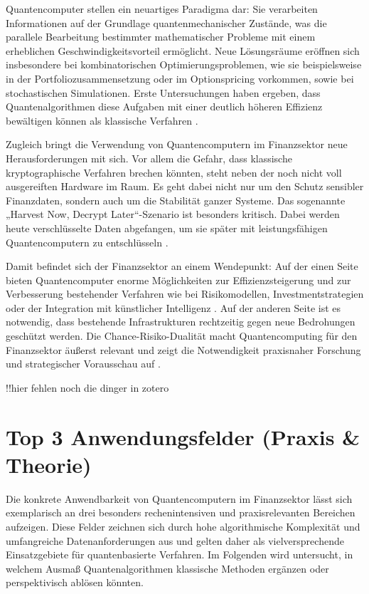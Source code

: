 Quantencomputer stellen ein neuartiges Paradigma dar: Sie verarbeiten Informationen auf der Grundlage quantenmechanischer Zustände, was die parallele Bearbeitung bestimmter mathematischer Probleme mit einem erheblichen Geschwindigkeitsvorteil ermöglicht. Neue Lösungsräume eröffnen sich insbesondere bei kombinatorischen Optimierungsproblemen, wie sie beispielsweise in der Portfoliozusammensetzung oder im Optionspricing vorkommen, sowie bei stochastischen Simulationen. Erste Untersuchungen haben ergeben, dass Quantenalgorithmen diese Aufgaben mit einer deutlich höheren Effizienz bewältigen können als klassische Verfahren \cite{quantumjournal2020,orus2019}.

Zugleich bringt die Verwendung von Quantencomputern im Finanzsektor neue Herausforderungen mit sich. Vor allem die Gefahr, dass klassische kryptographische Verfahren brechen könnten, steht neben der noch nicht voll ausgereiften Hardware im Raum. Es geht dabei nicht nur um den Schutz sensibler Finanzdaten, sondern auch um die Stabilität ganzer Systeme. Das sogenannte „Harvest Now, Decrypt Later“-Szenario ist besonders kritisch. Dabei werden heute verschlüsselte Daten abgefangen, um sie später mit leistungsfähigen Quantencomputern zu entschlüsseln \cite{finance21net}.

Damit befindet sich der Finanzsektor an einem Wendepunkt: Auf der einen Seite bieten Quantencomputer enorme Möglichkeiten zur Effizienzsteigerung und zur Verbesserung bestehender Verfahren   wie bei Risikomodellen, Investmentstrategien oder der Integration mit künstlicher Intelligenz \cite{finance21net}. Auf der anderen Seite ist es notwendig, dass bestehende Infrastrukturen rechtzeitig gegen neue Bedrohungen geschützt werden. Die Chance-Risiko-Dualität macht Quantencomputing für den Finanzsektor äußerst relevant und zeigt die Notwendigkeit praxisnaher Forschung und strategischer Vorausschau auf \cite{springer2025,orus2019}.

!!hier fehlen noch die dinger in zotero

\section{Top 3 Anwendungsfelder (Praxis \& Theorie)}

Die konkrete Anwendbarkeit von Quantencomputern im Finanzsektor lässt sich exemplarisch an drei besonders rechenintensiven und praxisrelevanten Bereichen aufzeigen. Diese Felder zeichnen sich durch hohe algorithmische Komplexität und umfangreiche Datenanforderungen aus und gelten daher als vielversprechende Einsatzgebiete für quantenbasierte Verfahren. Im Folgenden wird untersucht, in welchem Ausmaß Quantenalgorithmen klassische Methoden ergänzen oder perspektivisch ablösen könnten.

